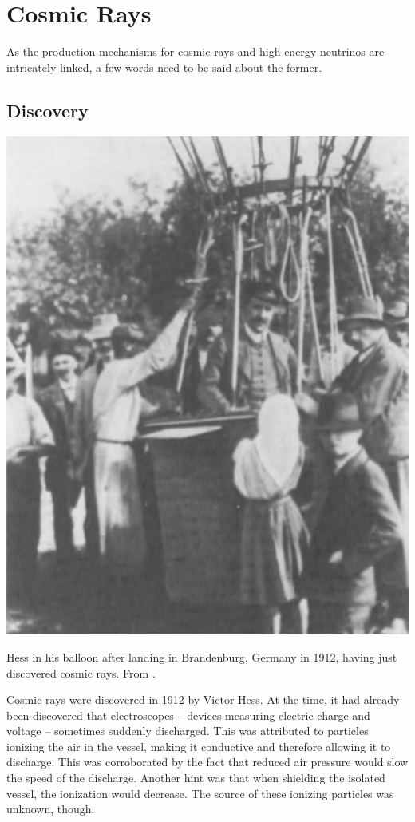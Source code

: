 \documentclass[
    a4paper, %
    fontsize=10pt, %
    twoside=false, %
    numbers=noenddot, %
    fontmethod=tex,
]{kaobook}
\begin{document}
\section{Cosmic Rays}
As the production mechanisms for cosmic rays and high-energy neutrinos are intricately linked, a few words need to be said about the former.

\subsection{Discovery}
\begin{marginfigure}
    \includegraphics{theory/hess_balloon.png}
    \caption[Hess in his balloon]{Hess in his balloon after landing in Brandenburg, Germany in 1912, having just discovered cosmic rays. From \cite{Steinmaurer1985}.}
\end{marginfigure}
Cosmic rays were discovered in 1912 by Victor Hess. At the time, it had already been discovered that electroscopes -- devices measuring electric charge and voltage -- sometimes suddenly discharged. This was attributed to particles ionizing the air in the vessel, making it conductive and therefore allowing it to discharge. This was corroborated by the fact that reduced air pressure would slow the speed of the discharge. Another hint was that when shielding the isolated vessel, the ionization would decrease. The source of these ionizing particles was unknown, though.
\end{document}
